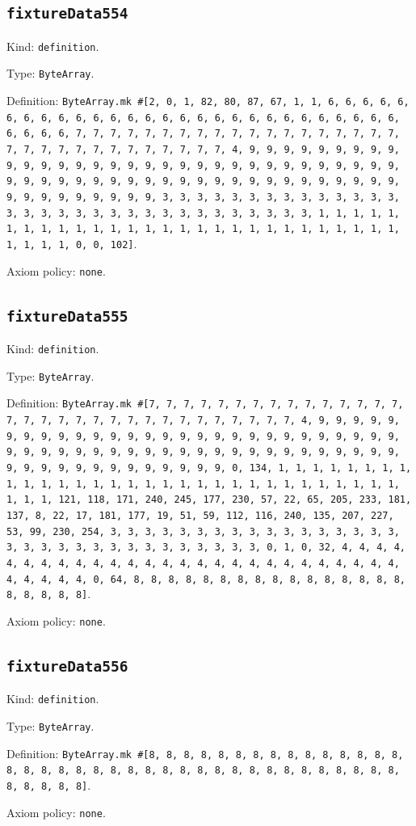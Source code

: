 \documentclass[11pt]{article}
\begin{document}
\subsection*{\texttt{fixtureData554}}
\noindent Kind: \texttt{definition}.\par
\noindent Type: \texttt{ByteArray}.\par
\noindent Definition: \texttt{ByteArray.mk \#[2, 0, 1, 82, 80, 87, 67, 1, 1, 6, 6, 6, 6, 6, 6, 6, 6, 6, 6, 6, 6, 6, 6, 6, 6, 6, 6, 6, 6, 6, 6, 6, 6, 6, 6, 6, 6, 6, 6, 6, 6, 7, 7, 7, 7, 7, 7, 7, 7, 7, 7, 7, 7, 7, 7, 7, 7, 7, 7, 7, 7, 7, 7, 7, 7, 7, 7, 7, 7, 7, 7, 7, 7, 4, 9, 9, 9, 9, 9, 9, 9, 9, 9, 9, 9, 9, 9, 9, 9, 9, 9, 9, 9, 9, 9, 9, 9, 9, 9, 9, 9, 9, 9, 9, 9, 9, 9, 9, 9, 9, 9, 9, 9, 9, 9, 9, 9, 9, 9, 9, 9, 9, 9, 9, 9, 9, 9, 9, 9, 9, 9, 9, 9, 9, 9, 9, 9, 9, 3, 3, 3, 3, 3, 3, 3, 3, 3, 3, 3, 3, 3, 3, 3, 3, 3, 3, 3, 3, 3, 3, 3, 3, 3, 3, 3, 3, 3, 3, 3, 3, 1, 1, 1, 1, 1, 1, 1, 1, 1, 1, 1, 1, 1, 1, 1, 1, 1, 1, 1, 1, 1, 1, 1, 1, 1, 1, 1, 1, 1, 1, 1, 1, 0, 0, 102]}.\par
\noindent Axiom policy: \texttt{none}.\par
\subsection*{\texttt{fixtureData555}}
\noindent Kind: \texttt{definition}.\par
\noindent Type: \texttt{ByteArray}.\par
\noindent Definition: \texttt{ByteArray.mk \#[7, 7, 7, 7, 7, 7, 7, 7, 7, 7, 7, 7, 7, 7, 7, 7, 7, 7, 7, 7, 7, 7, 7, 7, 7, 7, 7, 7, 7, 7, 7, 7, 4, 9, 9, 9, 9, 9, 9, 9, 9, 9, 9, 9, 9, 9, 9, 9, 9, 9, 9, 9, 9, 9, 9, 9, 9, 9, 9, 9, 9, 9, 9, 9, 9, 9, 9, 9, 9, 9, 9, 9, 9, 9, 9, 9, 9, 9, 9, 9, 9, 9, 9, 9, 9, 9, 9, 9, 9, 9, 9, 9, 9, 9, 9, 9, 9, 0, 134, 1, 1, 1, 1, 1, 1, 1, 1, 1, 1, 1, 1, 1, 1, 1, 1, 1, 1, 1, 1, 1, 1, 1, 1, 1, 1, 1, 1, 1, 1, 1, 1, 1, 1, 121, 118, 171, 240, 245, 177, 230, 57, 22, 65, 205, 233, 181, 137, 8, 22, 17, 181, 177, 19, 51, 59, 112, 116, 240, 135, 207, 227, 53, 99, 230, 254, 3, 3, 3, 3, 3, 3, 3, 3, 3, 3, 3, 3, 3, 3, 3, 3, 3, 3, 3, 3, 3, 3, 3, 3, 3, 3, 3, 3, 3, 3, 3, 3, 0, 1, 0, 32, 4, 4, 4, 4, 4, 4, 4, 4, 4, 4, 4, 4, 4, 4, 4, 4, 4, 4, 4, 4, 4, 4, 4, 4, 4, 4, 4, 4, 4, 4, 4, 4, 0, 64, 8, 8, 8, 8, 8, 8, 8, 8, 8, 8, 8, 8, 8, 8, 8, 8, 8, 8, 8, 8, 8]}.\par
\noindent Axiom policy: \texttt{none}.\par
\subsection*{\texttt{fixtureData556}}
\noindent Kind: \texttt{definition}.\par
\noindent Type: \texttt{ByteArray}.\par
\noindent Definition: \texttt{ByteArray.mk \#[8, 8, 8, 8, 8, 8, 8, 8, 8, 8, 8, 8, 8, 8, 8, 8, 8, 8, 8, 8, 8, 8, 8, 8, 8, 8, 8, 8, 8, 8, 8, 8, 8, 8, 8, 8, 8, 8, 8, 8, 8, 8, 8]}.\par
\noindent Axiom policy: \texttt{none}.\par
\end{document}
